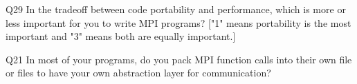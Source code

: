 \begin{description}%
\item{Q29} In the tradeoff between code portability and performance, which is more or less important for you to write MPI programs? ["1" means portability is the most important and "3" means both are equally important.]%
\item{Q21} In most of your programs, do you pack MPI function calls into their own file or files to have your own abstraction layer for communication?%
\end{description}%
